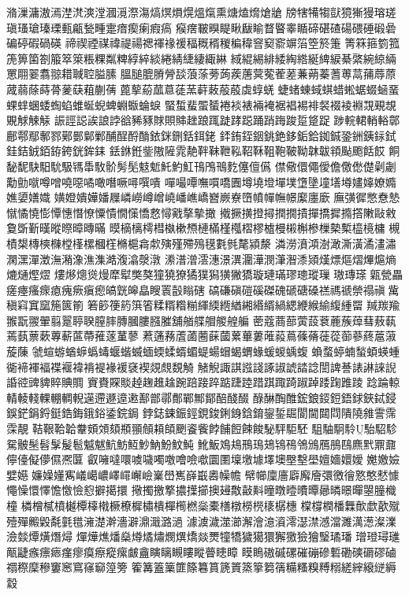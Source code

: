 潃漅滽滶漹漜滼漺漟漍漞漈漡熇熐熉熀熅熂熏煻熆熁熗牄
牓犗犕犓獃獍獑獌瑢瑳瑱瑵瑲瑧瑮甀甂甃畽疐瘖瘈瘌瘕瘑
瘊瘔皸瞁睼瞅瞂睮瞀睯睾瞃碲碪碴碭碨硾碫碞碥碠碬碢碤
禘禊禋禖禕禔禓禗禈禒禐稫穊稰稯稨稦窨窫窬竮箈箜箊箑
箐箖箍箌箛箎箅箘劄箙箤箂粻粿粼粺綧綷緂綣綪緁緀緅綝
緎緄緆緋緌綯綹綖綼綟綦綮綩綡緉罳翢翣翥翞耤聝聜膉膆
膃膇膍膌膋舕蒗蒤蒡蒟蒺蓎蓂蒬蒮蒫蒹蒴蓁蓍蒪蒚蒱蓐蒝
蒧蒻蒢蒔蓇蓌蒛蒩蒯蒨蓖蒘蒶蓏蒠蓗蓔蓒蓛蒰蒑虡蜳蜣
蜨蝫蝀蜮蜞蜡蜙蜛蝃蜬蝁蜾蝆蜠蜲蜪蜭蜼蜒蜺蜱蜵蝂蜦蜧
蜸蜤蜚蜰蜑裷裧裱裲裺裾裮裼裶裻裰裬裫覝覡覟覞觩觫觨
誫誙誋誒誏誖谽豨豩賕賏賗趖踉踂跿踍跽踊踃踇踆踅跾踀
踄輐輑輎輍鄣鄜鄠鄢鄟鄝鄚鄤鄡鄛酺酲酹酳銥銤鉶銛鉺銠
銔銪銍銦銚銫鉹銗鉿銣鋮銎銂銕銢鉽銈銡銊銆銌銙銧鉾銇
銩銝銋鈭隞隡雿靘靽靺靾鞃鞀鞂靻鞄鞁靿韎韍頖颭颮餂餀
餇馝馜駃馹馻馺駂馽駇骱髣髧鬾鬿魠魡魟鳱鳲鳵麧僿儃儰
僸儆儇僶僾儋儌僽儊劋劌勱勯噈噂噌嘵噁噊噉噆噘噚噀嘳
嘽嘬嘾嘸嘪嘺圚墫墝墱墠墣墯墬墥墡壿嫿嫴嫽嫷嫶嬃嫸嬂
嫹嬁嬇嬅嬏屧嶙嶗嶟嶒嶢嶓嶕嶠嶜嶡嶚嶞幩幝幠幜緳廛廞
廡彉徲憋憃慹憱憰憢憉憛憓憯憭憟憒憪憡憍慦憳戭摮摰撖
撠撅撗撜撏撋撊撌撣撟摨撱撘敶敺敹敻斲斳暵暰暩暲暷暪
暯樀樆樗槥槸樕槱槤樠槿槬槢樛樝槾樧槲槮樔槷槧橀樈槦
槻樍槼槫樉樄樘樥樏槶樦樇槴樖歑殥殣殢殦氁氀毿氂潁漦
潾澇濆澒澍澉澌潢潏澅潚澖潶潬澂潕潲潒潐潗澔澓潝漀潡
潫潽潧澐潓澋潩潿澕潣潷潪潻熲熯熛熰熠熚熩熵熝熥熞熤
熡熪熜熧熳犘犚獘獒獞獟獠獝獛獡獚獙獢璇璉璊璆璁瑽璅
璈瑼瑹甈甇畾瘥瘞瘙瘝瘜瘣瘚瘨瘛皜皝皞皛瞍瞏瞉瞈磍
碻磏磌磑磎磔磈磃磄磉禚禡禠禜禢禛歶稹窲窴窳箷篋箾
箬篎箯箹篊箵糅糈糌糋緷緛緪緧緗緡縃緺緦緶緱緰緮緟罶
羬羰羭翭翫翪翬翦翨聤聧膣膟膞膕膢膙膗舖艏艓艒艐艎艑
蔤蔻蔏蔀蔩蔎蔉蔍蔟蔊蔧蔜蓻蔫蓺蔈蔌蓴蔪蓲蔕蓷蓫蓳蓼
蔒蓪蓩蔖蓾蔨蔝蔮蔂蓽蔞蓶蔱蔦蓧蓨蓰蓯蓹蔘蔠蔰蔋蔙蔯
虢蝖蝣蝤蝷蟡蝳蝘蝔蝛蝒蝡蝚蝑蝞蝭蝪蝐蝎蝟蝝蝯蝬蝺蝮
蝜蝥蝏蝻蝵蝢蝧蝩衚褅褌褔褋褗褘褙褆褖褑褎褉覢覤覣觭
觰觬諏諆誸諓諑諔諕誻諗誾諀諅諘諃誺誽諙谾豍貏賥賟賙
賨賚賝賧趠趜趡趛踠踣踥踤踮踕踛踖踑踙踦踧踔踒踘踓踜
踗踚輬輤輘輚輠輣輖輗遳遰遯遧遫鄯鄫鄩鄪鄲鄦鄮醅醆醊
醁醂醄醀鋐鋃鋄鋀鋙銶鋏鋱鋟鋘鋩鋗鋝鋌鋯鋂鋨鋊鋈鋎鋦
鋍鋕鋉鋠鋞鋧鋑鋓銵鋡錥鋆銴镼閬閫閮閰隤隢雓霅霈霂靚
鞊鞎鞈韐韏頞頝頦頩頨頠頛頧颲餈飺餑餔餖餗餕駜駍駏駓
駔駎駉駖駘駋駗駌骳髬髫髳髲髱魆魃魧魴魱魦魶魵魰魨
魤魬鳼鳺鳽鳿鳷鴇鴀鳹鳻鴈鴅鴄麃黓鼏鼐儜儓儗儚儑凞匴
叡噰噠噮噳噦噣噭噲噞噷圜圛壈墽壉墿墺壂墼壆嬗嬙嬛嬡
嬔嬓嬐嬖嬨嬚嬠嬞寯嶬嶱嶩嶧嶵嶰嶮嶪嶨嶲嶭嶯嶴幧幨
幦幯廩廧廦廨廥彋徼徻憝憨憖懅憴懆懁懌憺憿憸憌擗擖擐
擏擉撽撉擃擛擳擙攳敿敼斢曈暾曀曊曋曏暽暻暺曌朣樴橦
橉橧樲橨樾橝橭橶橛橑樨橚樻樿橁橪橤橐橏橔橯橩橠樼橞
橖橕橍橎橆歕歔歖殧殪殫毈毇氄氃氆澭濋澣濇澼濎濈潞濄
澽澞濊澨瀄澥澮澺澬澪濏澿澸澢濉澫濍澯澲澰燅燂熿熸燖
燀燁燋燔燊燇燏熽燘熼燆燚燛犝犞獩獦獧獬獥獫獪瑿璚璠
璔璒璕璡甋疀瘯瘭瘱瘽瘳瘼瘵瘲瘰皻盦瞚瞝瞡瞜瞛瞢瞣瞕
瞙瞗磝磩磥磪磞磣磛磡磢磭磟磠禤穄穈穇窶窸窵窱窷篞篣
篧篝篕篥篚篨篹篔篪篢篜篫篘篟糒糔糗糐糑縒縡縗縌縟縠
